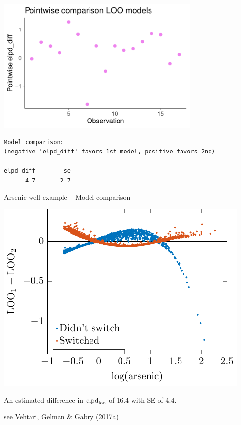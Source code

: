 \documentclass[english,t]{beamer}
\begin{document}
\begin{frame}[fragile]

  {\includegraphics[width=10cm]{milkelpddiff.pdf}}
  \\
  {\scriptsize
\begin{lstlisting}
Model comparison: 
(negative 'elpd_diff' favors 1st model, positive favors 2nd) 

elpd_diff        se 
      4.7       2.7 
\end{lstlisting}}

\end{frame}

\begin{frame}

  {\Large\color{navyblue} Arsenic well example -- Model comparison}

   
   \includegraphics[width=.8\textwidth]{arsenic12d.pdf}

   An estimated difference in ${\rm elpd}_{\rm loo}$ of 16.4 with SE of 4.4.
   
{\small see \href{http://link.springer.com/article/10.1007/s11222-016-9696-4}{Vehtari, Gelman \& Gabry (2017a)}}
\end{frame}
\end{document}
